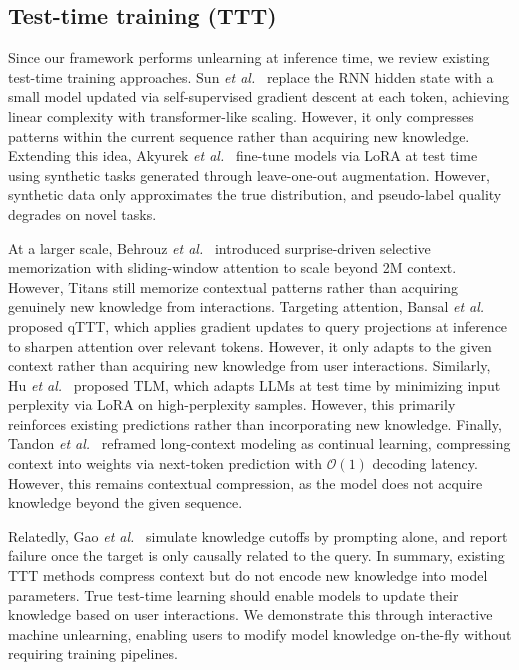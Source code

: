 \subsection{Test-time training (TTT)}
Since our framework performs unlearning at inference time, we review existing test-time training approaches. Sun \textit{et al.}~\cite{sun2024learning} replace the RNN hidden state with a small model updated via self-supervised gradient descent at each token, achieving linear complexity with transformer-like scaling. However, it only compresses patterns within the current sequence rather than acquiring new knowledge. Extending this idea, Akyurek \textit{et al.}~\cite{akyurek2024surprising} fine-tune models via LoRA at test time using synthetic tasks generated through leave-one-out augmentation. However, synthetic data only approximates the true distribution, and pseudo-label quality degrades on novel tasks. 

At a larger scale, Behrouz \textit{et al.}~\cite{behrouz2024titans} introduced surprise-driven selective memorization with sliding-window attention to scale beyond 2M context. However, Titans still memorize contextual patterns rather than acquiring genuinely new knowledge from interactions. Targeting attention, Bansal \textit{et al.}~\cite{bansal2025let} proposed qTTT, which applies gradient updates to query projections at inference to sharpen attention over relevant tokens. However, it only adapts to the given context rather than acquiring new knowledge from user interactions. Similarly, Hu \textit{et al.}~\cite{hu2025test} proposed TLM, which adapts LLMs at test time by minimizing input perplexity via LoRA on high-perplexity samples. However, this primarily reinforces existing predictions rather than incorporating new knowledge. Finally, Tandon \textit{et al.}~\cite{tandon2025end} reframed long-context modeling as continual learning, compressing context into weights via next-token prediction with $\mathcal{O}(1)$ decoding latency. However, this remains contextual compression, as the model does not acquire knowledge beyond the given sequence.

Relatedly, Gao \textit{et al.}~\cite{gao2025can} simulate knowledge cutoffs by prompting alone, and report failure once the target is only causally related to the query. In summary, existing TTT methods compress context but do not encode new knowledge into model parameters. True test-time learning should enable models to update their knowledge based on user interactions. We demonstrate this through interactive machine unlearning, enabling users to modify model knowledge on-the-fly without requiring training pipelines.
